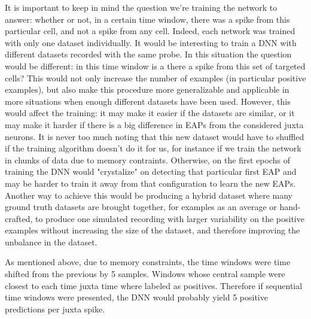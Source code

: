 It is important to keep in mind the question we're training the network to answer: whether or not, in a certain time window, there was a spike from this particular cell, and not a spike from any cell. Indeed, each network was trained with only one dataset individually. It would be interesting to train a DNN with different datasets recorded with the same probe. In this situation the question would be different: in this time window is a there a spike from this set of targeted cells? This would not only increase the number of examples (in particular positive examples), but also make this procedure more generalizable and applicable in more situations when enough different datasets have been used. However, this would affect the training: it may make it easier if the datasets are similar, or it may make it harder if there is a big difference in  EAPs from the considered juxta neurons. 
It is never too much noting that this new dataset would have to shuffled if the training algorithm doesn't do it for us, for instance if we train the network in chunks of data due to memory contraints. Otherwise, on the first epochs of training the DNN would "crystalize" on detecting that particular first EAP and may be harder to train it away from that configuration to learn the new EAPs. 
Another way to achieve this would be producing a hybrid dataset where many ground truth datasets are brought together, for examples as an average or hand-crafted, to produce one simulated recording with larger variability on the positive examples without increasing the size of the dataset, and therefore improving the unbalance in the dataset.

As mentioned above, due to memory constraints, the time windows were time shifted from the previous by 5 samples. Windows whose central sample were closest to each time juxta time where labeled as positives. Therefore if sequential time windows were presented, the DNN would probably yield 5  positive predictions per juxta spike.